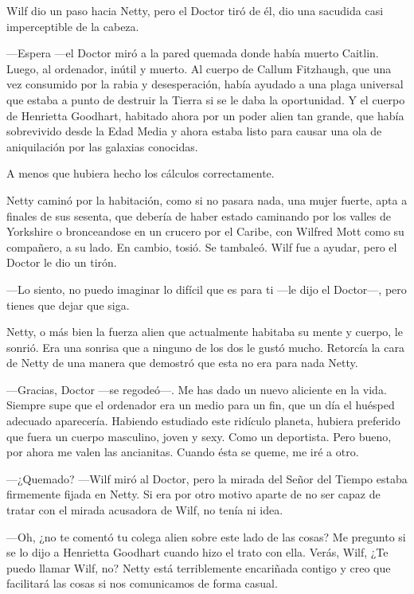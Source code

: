 Wilf dio un paso hacia Netty, pero el Doctor tiró de él, dio una
sacudida casi imperceptible de la cabeza.

---Espera ---el Doctor miró a la pared quemada donde había muerto
Caitlin. Luego, al ordenador, inútil y muerto. Al cuerpo de Callum
Fitzhaugh, que una vez consumido por la rabia y desesperación, había
ayudado a una plaga universal que estaba a punto de destruir la Tierra
si se le daba la oportunidad. Y el cuerpo de Henrietta Goodhart,
habitado ahora por un poder alien tan grande, que había sobrevivido
desde la Edad Media y ahora estaba listo para causar una ola de
aniquilación por las galaxias conocidas.

A menos que hubiera hecho los cálculos correctamente.

Netty caminó por la habitación, como si no pasara nada, una mujer
fuerte, apta a finales de sus sesenta, que debería de haber estado
caminando por los valles de Yorkshire o bronceandose en un crucero por
el Caribe, con Wilfred Mott como su compañero, a su lado. En cambio,
tosió. Se tambaleó. Wilf fue a ayudar, pero el Doctor le dio un tirón.

---Lo siento, no puedo imaginar lo difícil que es para ti ---le dijo el
Doctor---, pero tienes que dejar que siga.

Netty, o más bien la fuerza alien que actualmente habitaba su mente y
cuerpo, le sonrió. Era una sonrisa que a ninguno de los dos le gustó
mucho. Retorcía la cara de Netty de una manera que demostró que esta no
era para nada Netty.

---Gracias, Doctor ---se regodeó---. Me has dado un nuevo aliciente en
la vida. Siempre supe que el ordenador era un medio para un fin, que un
día el huésped adecuado aparecería. Habiendo estudiado este ridículo
planeta, hubiera preferido que fuera un cuerpo masculino, joven y sexy.
Como un deportista. Pero bueno, por ahora me valen las ancianitas.
Cuando ésta se queme, me iré a otro.

---¿Quemado? ---Wilf miró al Doctor, pero la mirada del Señor del Tiempo
estaba firmemente fijada en Netty. Si era por otro motivo aparte de no
ser capaz de tratar con el mirada acusadora de Wilf, no tenía ni idea.

---Oh, ¿no te comentó tu colega alien sobre este lado de las cosas? Me
pregunto si se lo dijo a Henrietta Goodhart cuando hizo el trato con
ella. Verás, Wilf, ¿Te puedo llamar Wilf, no? Netty está terriblemente
encariñada contigo y creo que facilitará las cosas si nos comunicamos de
forma casual.

